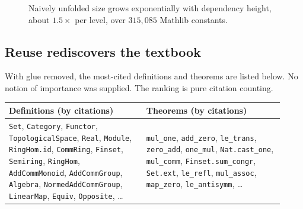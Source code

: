 \documentclass[11pt]{article}
\theoremstyle{remark}
\newcommand{\lean}[1]{\texttt{#1}}
\begin{document}
\begin{figure}[t]
\centering
{}
\caption{Naively unfolded size grows exponentially with dependency height, about
$1.5\times$ per level, over $315{,}085$ Mathlib constants.}
\label{fig:growth}
\end{figure}

\subsection{Reuse rediscovers the textbook}

With glue removed, the most-cited definitions and theorems are listed below. No notion of
importance was supplied. The ranking is pure citation counting.

\begin{center}\small
\begin{tabular}{p{0.46\linewidth}p{0.46\linewidth}}
\toprule
\textbf{Definitions} (by citations) & \textbf{Theorems} (by citations) \\
\midrule
\lean{Set}, \lean{Category}, \lean{Functor}, \lean{TopologicalSpace}, \lean{Real},
\lean{Module}, \lean{RingHom.id}, \lean{CommRing}, \lean{Finset}, \lean{Semiring},
\lean{RingHom}, \lean{AddCommMonoid}, \lean{AddCommGroup}, \lean{Algebra},
\lean{NormedAddCommGroup}, \lean{LinearMap}, \lean{Equiv}, \lean{Opposite}, \ldots
&
\lean{mul\_one}, \lean{add\_zero}, \lean{le\_trans}, \lean{zero\_add}, \lean{one\_mul},
\lean{Nat.cast\_one}, \lean{mul\_comm}, \lean{Finset.sum\_congr}, \lean{Set.ext},
\lean{le\_refl}, \lean{mul\_assoc}, \lean{map\_zero}, \lean{le\_antisymm}, \ldots \\
\bottomrule
\end{tabular}
\end{center}
\end{document}
